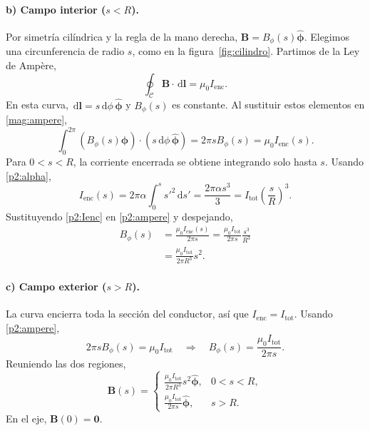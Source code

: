 \documentclass[11pt]{article}
\newcommand{\dd}{\,\mathrm{d}}
\newcommand{\ep}{\hat{\boldsymbol{\phi}}}
\begin{document}
\paragraph{b) Campo interior ($s<R$).}
Por simetría cilíndrica y la regla de la mano derecha,
$\mathbf B=B_\phi(s)\ep$. Elegimos una circunferencia de radio
$s$, como en la figura~\ref{fig:cilindro}. Partimos de la Ley de Ampère,
\begin{equation}
  \oint_{\mathcal C}\mathbf B\cdot\dd\mathbf l
    =\mu_0I_{\mathrm{enc}}.
  \label{mag:ampere}
\end{equation}
En esta curva, $\dd\mathbf l=s\dd\phi\,\ep$ y $B_\phi(s)$ es
constante. Al sustituir estos elementos en \eqref{mag:ampere},
\begin{equation}
  \int_0^{2\pi}(B_\phi(s)\ep)\cdot(s\dd\phi\,\ep)
    =2\pi sB_\phi(s)=\mu_0I_{\mathrm{enc}}(s).
  \label{p2:ampere}
\end{equation}
Para $0<s<R$, la corriente encerrada se obtiene integrando solo
hasta $s$. Usando \eqref{p2:alpha},
\begin{equation}
  I_{\mathrm{enc}}(s)
    =2\pi\alpha\int_0^s s'^2\dd s'
    =\frac{2\pi\alpha s^3}{3}
    =I_{\mathrm{tot}}\left(\frac{s}{R}\right)^3.
  \label{p2:Ienc}
\end{equation}
Sustituyendo \eqref{p2:Ienc} en \eqref{p2:ampere} y despejando,
\begin{align*}
  B_\phi(s)
    &=\frac{\mu_0I_{\mathrm{enc}}(s)}{2\pi s}
      =\frac{\mu_0I_{\mathrm{tot}}}{2\pi s}\frac{s^3}{R^3}\\
    &=\frac{\mu_0I_{\mathrm{tot}}}{2\pi R^3}s^2.
\end{align*}

\paragraph{c) Campo exterior ($s>R$).}
La curva encierra toda la sección del conductor, así que
$I_{\mathrm{enc}}=I_{\mathrm{tot}}$. Usando \eqref{p2:ampere},
\[
  2\pi sB_\phi(s)=\mu_0I_{\mathrm{tot}}
  \quad\Longrightarrow\quad
  B_\phi(s)=\frac{\mu_0I_{\mathrm{tot}}}{2\pi s}.
\]
Reuniendo las dos regiones,
\begin{equation}
  \boxed{
    \mathbf B(s)=
    \begin{cases}
      \displaystyle
      \frac{\mu_0I_{\mathrm{tot}}}{2\pi R^3}s^2\ep,
        &0<s<R,\\[7pt]
      \displaystyle
      \frac{\mu_0I_{\mathrm{tot}}}{2\pi s}\ep,
        &s>R.
    \end{cases}
  }
  \label{p2:B}
\end{equation}
En el eje, $\mathbf B(0)=\mathbf0$.
\end{document}
